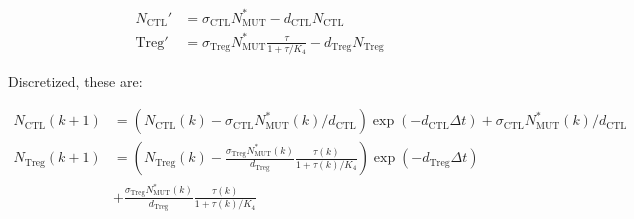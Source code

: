 \documentclass[11pt]{article}
\begin{document}
\begin{equation}\tag{2.9}
\begin{split}
N_\text{CTL}' & = \sigma_{\text{CTL}}N_{\text{MUT}}^* - d_{\text{CTL}}N_\text{CTL} \\
\text{Treg}' & = \sigma_{\text{Treg}}N_{\text{MUT}}^* \frac{\tau}{1+\tau/K_4}- d_{\text{Treg}}N_\text{Treg}
\end{split}
\end{equation}

Discretized, these are:

\begin{equation}\tag{2.10}
\begin{split}
N_\text{CTL}(k+1) & =  \left (N_\text{CTL}(k)-\sigma_{\text{CTL}}N_{\text{MUT}}^*(k)/d_{\text{CTL}}\right )\exp(- d_{\text{CTL}}\Delta t) + \sigma_{\text{CTL}}N_{\text{MUT}}^*(k)/d_{\text{CTL}}\\
N_\text{Treg}(k+1) & =  \left (N_\text{Treg}(k)-\frac{\sigma_{\text{Treg}}N_{\text{MUT}}^*(k)}{d_{\text{Treg}}} \frac{\tau(k)}{1+\tau(k)/K_4}\right )\exp(-d_{\text{Treg}}\Delta t)\\
&+ \frac{\sigma_{\text{Treg}}N_{\text{MUT}}^*(k)}{d_{\text{Treg}}} \frac{\tau(k)}{1+\tau(k)/K_4}
\end{split}
\end{equation}
\end{document}
